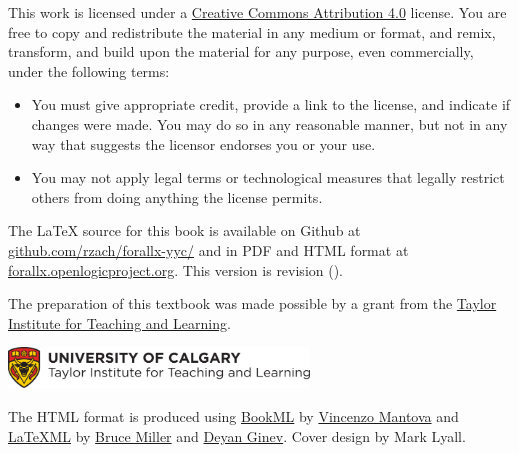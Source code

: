 \ifHTMLtarget\else
  \bigskip

  \noindent\footnotesize
\fi
This work is licensed under a \href{https://creativecommons.org/licenses/by/4.0/}{Creative Commons Attribution 4.0} license.
You are free to copy and redistribute the material in any medium or format, and  remix, transform, and build upon the material for any purpose, even commercially, under the following terms:
\begin{itemize}
\item You must give appropriate credit, provide a link to the license, and indicate if changes were made. You may do so in any reasonable manner, but not in any way that suggests the licensor endorses you or your use.
\item You may not apply legal terms or technological measures that legally restrict others from doing anything the license permits.
\end{itemize}

\ifHTMLtarget\else
\vfil\normalsize\noindent
\fi
The \LaTeX{} source for this book is available on Github at
\href{https://github.com/rzach/forallx-yyc/}{github.com/rzach/forallx-yyc/} and in PDF and
HTML format at
\href{https://forallx.openlogicproject.org}{forallx.openlogicproject.org}.
This version is revision \gitAbbrevHash{}
(\gitAuthorDate).

\bigskip
\noindent
The preparation of this textbook was made possible by a grant from the \href{https://taylorinstitute.ucalgary.ca/}{Taylor Institute for Teaching and Learning}.

\bigskip
\noindent
\href{https://taylorinstitute.ucalgary.ca/}{\includegraphics[width=8cm]{assets/ti-color}}

\ifHTMLtarget
The HTML format is produced using
\href{https://vlmantova.github.io/bookml/}{BookML} by
\href{https://eps.leeds.ac.uk/maths/staff/4058/dr-vincenzo-l-mantova}{Vincenzo Mantova}
and \href{https://dlmf.nist.gov/LaTeXML/}{\LaTeX{}ML} by
\href{https://www.nist.gov/people/bruce-r-miller}{Bruce Miller} and
\href{https://prodg.org/}{Deyan Ginev}. 
\else
\bigskip
\noindent Cover design by Mark Lyall.
\fi
